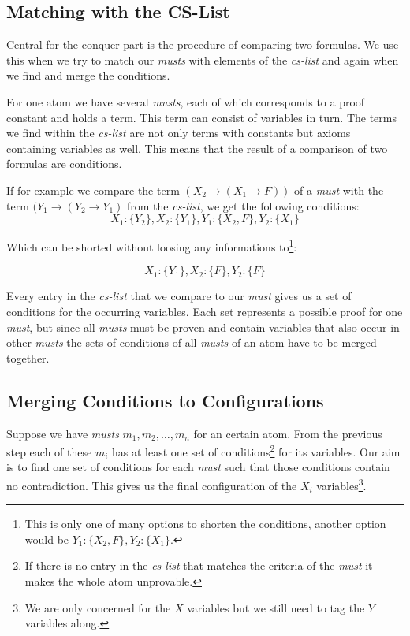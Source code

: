 \subsection{Matching with the CS-List}
Central for the conquer part is the procedure of comparing two formulas. We use this when we try to match our \emph{musts} with elements of the \emph{cs-list} and  again when we find and merge the conditions.

For one atom we have several \emph{musts}, each of which corresponds to a proof constant and holds a term. This term can consist of variables in turn. The terms we find within the \emph{cs-list} are not only terms with constants but axioms containing variables as well. This means that the result of a comparison of two formulas are conditions. 

If for example we compare the term $(X_2 \rightarrow (X_1 \rightarrow F))$ of a \emph{must} with the term $(Y_1 \rightarrow (Y_2 \rightarrow Y_1)$ from the \emph{cs-list}, we get the following conditions:
\begin{equation*}
	X_1 : \{Y_2\}, X_2 : \{Y_1\}, Y_1 : \{X_2, F\}, Y_2 : \{X_1\} 
\end{equation*}

Which can be shorted without loosing any informations to\footnote{This is only one of many options to shorten the conditions, another option would be $Y_1: \{X_2, F\}, Y_2:\{X_1\}$.}:

\begin{equation*}
	X_1 : \{Y_1\}, X_2 : \{F\}, Y_2 : \{F\}
\end{equation*}

Every entry in the \emph{cs-list} that we compare to our \emph{must} gives us a set of conditions for the occurring variables. Each set represents a possible proof for one \emph{must}, but since all \emph{musts} must be proven and contain variables that also occur in other \emph{musts} the sets of conditions of all \emph{musts} of an atom have to be merged together.

\subsection{Merging Conditions to Configurations}
Suppose we have \emph{musts} $m_1, m_2, \dots, m_n$ for an certain atom. From the previous step each of these $m_i$ has at least one set of conditions\footnote{If there is no entry in the \emph{cs-list} that matches the criteria of the \emph{must} it makes the whole atom unprovable.} for its variables. Our aim is to find one set of conditions for each \emph{must} such that those conditions contain no contradiction. This gives us the final configuration of the $X_i$ variables\footnote{We are only concerned for the $X$ variables but we still need to tag the $Y$ variables along.}.


